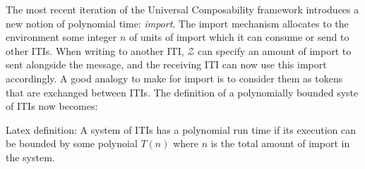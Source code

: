 The most recent iteration of the Universal Composability framework introduces a new notion of polynomial time: \textit{import}.
The import mechanism allocates to the environment some integer $n$ of units of import which it can consume or send to other ITIs.
When writing to another ITI, $\mathcal{Z}$ can specify an amount of import to sent alongside the message, and the receiving ITI can now use this import accordingly.
A good analogy to make for import is to consider them as tokens that are exchanged between ITIs. 
The definition of a polynomially bounded syste of ITIs now becomes: 

Latex definition: A system of ITIs has a polynomial run time if its execution can be bounded by some polynoial $T(n)$ where $n$ is the total amount of import in the system.



